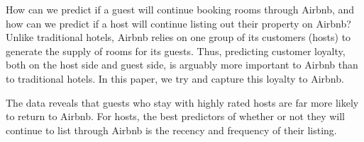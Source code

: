 \documentclass[sigconf]{acmart}
\begin{document}
How can we predict if a guest will continue booking rooms through Airbnb, and how can we predict if a host will continue listing out their property on Airbnb? Unlike traditional hotels, Airbnb relies on one group of its customers (hosts) to generate the supply of rooms for its guests. Thus, predicting customer loyalty, both on the host side and guest side, is arguably more important to Airbnb than to traditional hotels. In this paper, we try and capture this loyalty to Airbnb.

The data reveals that guests who stay with highly rated hosts are far more likely to return to Airbnb. For hosts, the best predictors of whether or not they will
continue to list through Airbnb is the recency and frequency of their listing.




\end{document}
